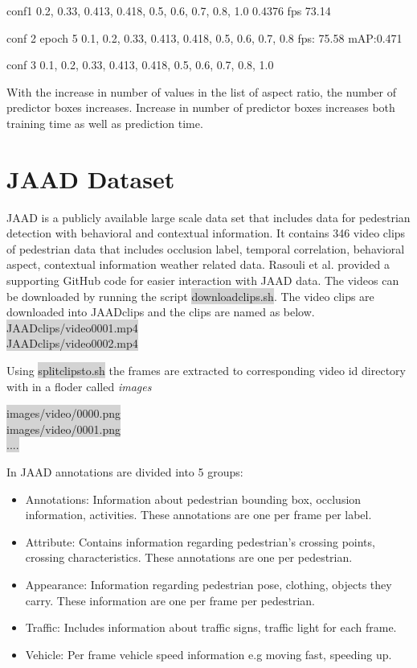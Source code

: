 conf1
0.2, 0.33, 0.413, 0.418, 0.5, 0.6, 0.7, 0.8, 1.0
0.4376
fps 73.14

conf 2
epoch 5
0.1, 0.2, 0.33, 0.413, 0.418, 0.5, 0.6, 0.7, 0.8
fps: 75.58 
mAP:0.471

conf 3 
0.1, 0.2, 0.33, 0.413, 0.418, 0.5, 0.6, 0.7, 0.8, 1.0




With the increase in number of values in the list of aspect ratio, the number of predictor boxes increases. Increase in number of predictor boxes increases both training time as well as prediction time.

\section{JAAD Dataset}

JAAD \cite{rasouli2017agreeing} is a publicly available large scale data set that includes data for pedestrian detection with behavioral and contextual information. It contains 346 video clips of pedestrian data that includes occlusion label, temporal correlation, behavioral aspect, contextual information weather related data. Rasouli et al. provided a supporting GitHub code for easier interaction with JAAD data. The videos can be downloaded by running the script \colorbox{lightgray}{download\textunderscore clips.sh}. The video clips are downloaded into JAAD\textunderscore clips and the clips are named as below.\\
\colorbox{lightgray} {JAAD\textunderscore clips/video\textunderscore  0001.mp4} \\
\colorbox{lightgray} {JAAD\textunderscore clips/video\textunderscore  0002.mp4}

Using \colorbox{lightgray}{split\textunderscore clips\textunderscore to\textunderscore .sh} the frames are extracted to corresponding video id directory with in a floder called \textit{images} \\
\begin{center}
\colorbox{lightgray} {images/video/0000.png} \\
\colorbox{lightgray} {images/video/0001.png} \\
\colorbox{lightgray} {....}
\end{center}

In JAAD annotations are divided into 5 groups:
\begin{itemize}
	\item Annotations: Information about pedestrian bounding box, occlusion information, activities. These annotations are one per frame per label.
	\item Attribute: Contains information regarding pedestrian’s crossing points, crossing characteristics. These annotations are one per pedestrian.
	\item Appearance: Information regarding pedestrian pose, clothing, objects they carry. These information are one per frame per pedestrian.
	\item Traffic: Includes information about traffic signs, traffic light for each frame.
	\item Vehicle: Per frame vehicle speed information e.g moving fast, speeding up.
\end{itemize}


